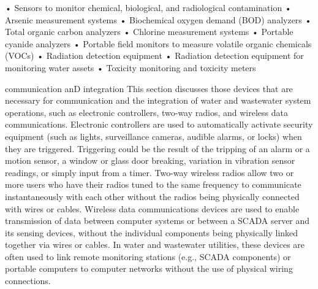 \documentclass{article}
\begin{document}
• Sensors to monitor chemical, biological, and radiological
contamination • Arsenic measurement systems • Biochemical oxygen demand
(BOD) analyzers • Total organic carbon analyzers • Chlorine measurement
systems • Portable cyanide analyzers • Portable field monitors to
measure volatile organic chemicals (VOCs) • Radiation detection
equipment • Radiation detection equipment for monitoring water assets •
Toxicity monitoring and toxicity meters

communication anD integration This section discusses those devices that
are necessary for communication and the integration of water and
wastewater system operations, such as electronic controllers, two-way
radios, and wireless data communications. Electronic controllers are
used to automatically activate security equipment (such as lights,
surveillance cameras, audible alarms, or locks) when they are triggered.
Triggering could be the result of the tripping of an alarm or a motion
sensor, a window or glass door breaking, variation in vibration sensor
readings, or simply input from a timer. Two-way wireless radios allow
two or more users who have their radios tuned to the same frequency to
communicate instantaneously with each other without the radios being
physically connected with wires or cables. Wireless data communications
devices are used to enable transmission of data between computer systems
or between a SCADA server and its sensing devices, without the
individual components being physically linked together via wires or
cables. In water and wastewater utilities, these devices are often used
to link remote monitoring stations (e.g., SCADA components) or portable
computers to computer networks without the use of physical wiring
connections.
\end{document}
